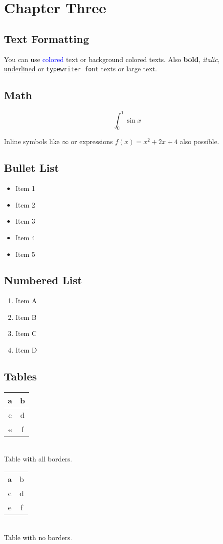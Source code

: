 \documentclass[12pt, twoside]{book}
\begin{document}
\chapter{Chapter Three}
\section{Text Formatting}
You can use \textcolor{blue}{colored} text or \colorbox{BurntOrange}{background colored} texts. Also \textbf{bold}, \textit{italic}, \underline{underlined} or \texttt{typewriter font} texts or \large{large} text.

\section{Math}
$$\int_0^1{\sin x}$$

Inline symbols like $\infty$ or expressions $f(x) = x^2 + 2x + 4$ also possible.

\section{Bullet List}

\begin{itemize}
    \item Item 1
    \item Item 2
    \item Item 3
    \item Item 4
    \item Item 5
\end{itemize}

\section{Numbered List}

\begin{enumerate}
    \item Item A
    \item Item B
    \item Item C
    \item Item D
\end{enumerate}

\section{Tables}

\begin{center}
        \begin{tabular}{|c|c|} \hline
        a & b \\ \hline
        c & d \\ \hline
        e & f \\ \hline
    \end{tabular} \\[12pt]
    Table with all borders.
\end{center}

\vspace{1cm}

\begin{center}
        \begin{tabular}{cc}
        a & b \\
        c & d \\
        e & f \\
    \end{tabular} \\[12pt]
    Table with no borders.
\end{center}
\end{document}
